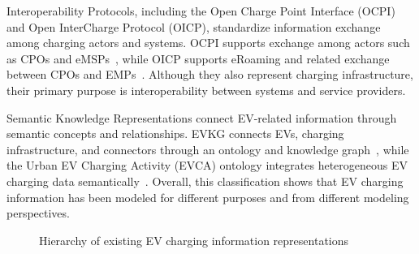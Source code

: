 \documentclass[sigconf]{acmart}
\begin{document}
Interoperability Protocols, including the Open Charge Point Interface (OCPI) and Open InterCharge Protocol (OICP), standardize information exchange among charging actors and systems. OCPI supports exchange among actors such as CPOs and eMSPs~\cite{ocpi}, while OICP supports eRoaming and related exchange between CPOs and EMPs~\cite{oicp}. Although they also represent charging infrastructure, their primary purpose is interoperability between systems and service providers.

Semantic Knowledge Representations connect EV-related information through semantic concepts and relationships. EVKG connects EVs, charging infrastructure, and connectors through an ontology and knowledge graph~\cite{evkg}, while the Urban EV Charging Activity (EVCA) ontology integrates heterogeneous EV charging data semantically~\cite{evca}. Overall, this classification shows that EV charging information has been modeled for different purposes and from different modeling perspectives.

\begin{figure}[t!]
\centering
{}
\caption{Hierarchy of existing EV charging information representations}
\label{fig:hierarchy}
\end{figure}
\end{document}
